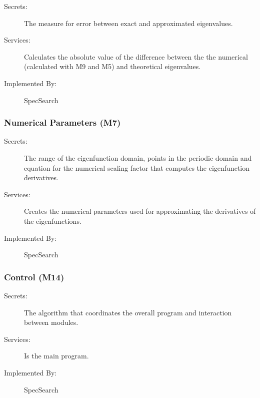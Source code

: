 \documentclass[12pt, titlepage]{article}
\begin{document}
	\begin{description}
		\item[Secrets:] The measure for error between exact and approximated 
		eigenvalues.
		\item[Services:]Calculates the absolute value of the difference between
		the the  numerical (calculated with M9 and M5) and
		theoretical eigenvalues. 
		\item[Implemented By:] SpecSearch
	\end{description} 
	
	\subsubsection{Numerical Parameters (M7)} 
	
	\begin{description}
		\item[Secrets:] The range of the eigenfunction domain, points in the 
		periodic domain and equation for the numerical scaling factor that 
		computes 
		the 
		eigenfunction derivatives. 
		\item[Services:] Creates the numerical parameters used for 
		approximating 
		the derivatives of the eigenfunctions. 
		\item[Implemented By:] SpecSearch
	\end{description} 
	
	\subsubsection{Control (M14)} 
	
	\begin{description}
		\item[Secrets:] The algorithm that coordinates the overall program and 
		interaction between modules. 
		\item[Services:] Is the main program.
		\item[Implemented By:] SpecSearch
	\end{description}
	
\end{document}
